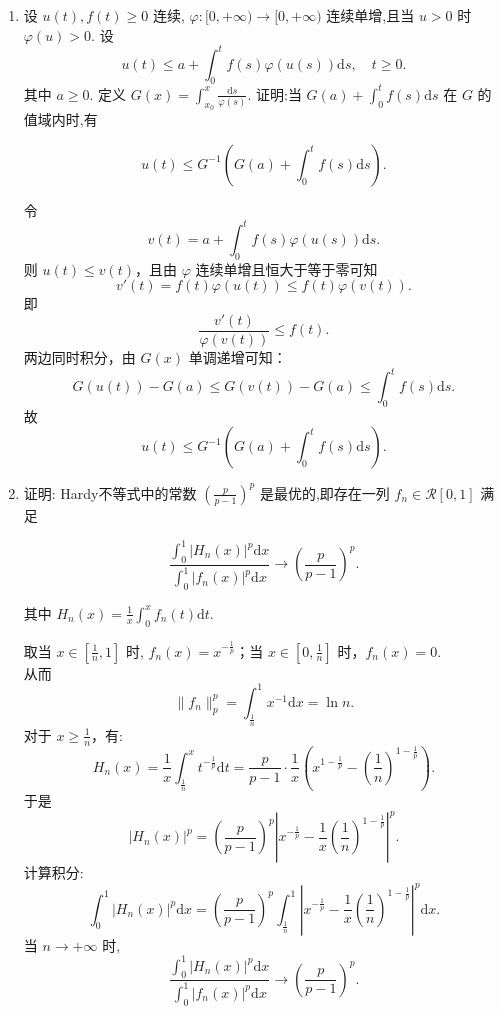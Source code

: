 \begin{enumerate}
    \item[3.]设 \(\displaystyle u(t),f(t)\geq 0\) 连续, \(\displaystyle \varphi :[0,+\infty)\to [0,+\infty)\) 连续单增,且当 \(u > 0\) 时 \(\displaystyle\varphi (u) > 0\). 
    设
    \[\displaystyle u(t)\leq a + \int_{0}^{t}f(s)\varphi (u(s))\mathrm{d}s,\quad t\geq 0.\]
    其中 \(a\geq 0\). 定义 \(\displaystyle G(x) = \int_{x_{0}}^{x}\frac{\mathrm{d}s}{\varphi(s)}\). 证明:当 \(\displaystyle G(a) + \int_{0}^{t}f(s)\mathrm{d}s\) 在 \(G\) 的值域内时,有

    \[\displaystyle u(t)\leq G^{-1}\left(G(a) + \int_{0}^{t}f(s)\mathrm{d}s\right).\]
    \begin{solution}
        令
        \[
        v(t) = a + \int_0^t f(s)\varphi(u(s)) \mathrm{d}s.
        \]
        则 $u(t) \leq v(t)$，且由 $\varphi$ 连续单增且恒大于等于零可知 
        \[
        v'(t)=f(t)\varphi(u(t)) \leq f(t)\varphi(v(t)).
        \]
        即
        \[
        \frac{v'(t)}{\varphi(v(t))}\leq f(t).
        \]
        两边同时积分，由 $G(x)$ 单调递增可知：
        \[
        G(u(t))-G(a)\leq G(v(t)) - G(a) \leq \int_0^t f(s) \mathrm{d}s.
        \]
        故 
        \[
        u(t) \leq G^{-1}(G(a) + \int_0^t f(s) \mathrm{d}s).
        \]
    \end{solution}
    
    \item[4.]证明: Hardy不等式中的常数 \(\displaystyle\left(\frac{p}{p - 1}\right)^{p}\) 是最优的,即存在一列 \(\displaystyle f_{n}\in \mathcal{R}[0,1]\) 满足

    \[\displaystyle\frac{\displaystyle\int_{0}^{1}|H_{n}(x)|^{p}\mathrm{d}x}{\displaystyle\int_{0}^{1}|f_{n}(x)|^{p}\mathrm{d}x}\to \left(\frac{p}{p - 1}\right)^{p}.\]

    其中 \(\displaystyle H_{n}(x) = \displaystyle \frac{1}{x}\int_{0}^{x}f_{n}(t)\mathrm{d}t.\)
    \begin{solution}
        取当 $\displaystyle x \in [\frac{1}{n}, 1]$ 时, $\displaystyle f_n(x) = x^{-\frac{1}{p}}$；当 $\displaystyle x \in [0, \frac{1}{n}]$ 时，$f_n(x) = 0$. \\
        从而
        \[ \|f_n\|_p^p = \int_{\frac{1}{n}}^1 x^{-1}\mathrm{d}x = \ln n. \]
        对于 $\displaystyle x \geq \frac{1}{n}$，有: 
        \[ H_n(x) = \frac{1}{x} \int_{\frac{1}{n}}^x t^{-\frac{1}{p}} \mathrm{d}t = \frac{p}{p-1}\cdot\frac{1}{x} \left(x^{1-\frac{1}{p}} - \left(\frac{1}{n}\right)^{1-\frac{1}{p}}\right). \]
        于是 
        \[ |H_n(x)|^p = \left(\frac{p}{p-1}\right)^p \left|x^{-\frac{1}{p}} - \frac{1}{x}\left(\frac{1}{n}\right)^{1-\frac{1}{p}}\right|^p. \]
        计算积分: 
        \[ \int_0^1 |H_n(x)|^p \mathrm{d}x = \left(\frac{p}{p-1}\right)^p \int_{\frac{1}{n}}^1 \left|x^{-\frac{1}{p}} - \frac{1}{x}\left(\frac{1}{n}\right)^{1-\frac{1}{p}}\right|^p \mathrm{d}x. \]
        当 $n \to +\infty$ 时, 
        \[
        \frac{\displaystyle \int_0^1 \left|H_{n}(x)\right|^p\mathrm{d}x}{\displaystyle \int_0^1\left|f_{n}(x)\right|^p\mathrm{d}x}\to \left(\frac{p}{p-1}\right)^p.
        \]
    \end{solution}
    

\end{enumerate}
